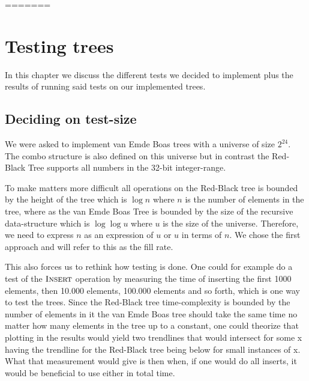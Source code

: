 \documentclass[oneside,11pt,openright]{report}
\newcommand{\Insert}{\textsc{Insert}}
\begin{document}
=======
\chapter{Testing trees}

In this chapter we discuss the different tests we decided to implement plus the results of running said tests on our implemented trees. 

\section{Deciding on test-size}
We were asked to implement van Emde Boas trees with a universe of size $2^24$. The combo structure is also defined on this universe but in contrast the Red-Black Tree supports all numbers in the 32-bit integer-range.

To make matters more difficult all operations on the Red-Black tree is bounded by the height of the tree which is $\log n$ where $n$ is the number of elements in the tree, where as the van Emde Boas Tree is bounded by the size of the recursive data-structure which is $\log \log u$ where $u$ is the size of the universe. Therefore, we need to express $n$ as an expression of $u$ or $u$ in terms of $n$. We chose the first approach and will refer to this as the fill rate.

This also forces us to rethink how testing is done. One could for example do a test of the $\Insert$ operation by measuring the time of inserting the first 1000 elements, then 10.000 elements, 100.000 elements and so forth, which is one way to test the trees. Since the Red-Black tree time-complexity is bounded by the number of elements in it the van Emde Boas tree should take the same time no matter how many elements in the tree up to a constant, one could theorize that plotting in the results would yield two trendlines that would intersect for some x having the trendline for the Red-Black tree being below for small instances of x. What that measurement would give is then when, if one would do all inserts, it would be beneficial to use either in total time.
\end{document}
